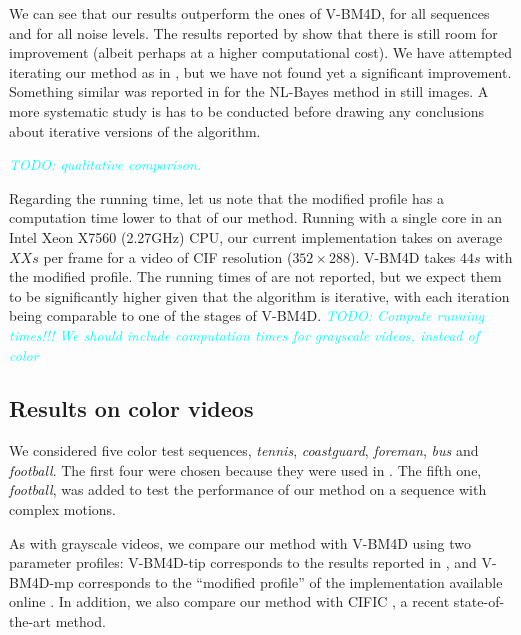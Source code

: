 \documentclass[10pt, journal, twocolumn, final, a4paper]{IEEEtran}
\newcommand{\pa}[1]{\textcolor{cyan}{#1}}
\newcommand{\pcomment}[1]{\textit{\pa{#1}}}
\begin{document}
We can see that our results outperform the ones of V-BM4D, for all sequences and 
for all noise levels. The results reported by \cite{LiZhangDai2011} show that there
is still room for improvement (albeit perhaps at a higher computational cost).
%
We have attempted iterating our method as in \cite{LiZhangDai2011},
but we have not found yet a significant improvement. Something similar was
reported in \cite{Lebrun2013ipol,Lebrun2013a} for the NL-Bayes method in still
images. %
A more systematic study is has to be conducted before drawing any
conclusions about iterative versions of the algorithm.

\pcomment{TODO: qualitative comparison.}

Regarding the running time, let us note that the modified profile has a
computation time lower to that of our method. Running with a
single core in an Intel Xeon X7560 (2.27GHz) CPU, 
our current implementation takes on average $XXs$ per frame for a video of CIF
resolution ($352\times288$). V-BM4D takes $44s$ with the modified profile.
The running times of \cite{LiZhangDai2011} are not reported, but we expect them
to be significantly higher given that the algorithm is iterative, with each iteration 
being comparable to one of the stages of V-BM4D.
\pcomment{TODO: Compute running times!!!}
\pcomment{We should include computation times for grayscale videos, instead of color}


\subsection{Results on color videos}

We considered five color test sequences, \emph{tennis}, \emph{coastguard},
\emph{foreman}, \emph{bus} and \emph{football}. The first four were chosen
because they were used in \cite{Maggioni2012}. The fifth one, \emph{football},
was added to test the performance of our method on a sequence with complex motions.

As with grayscale videos, we compare our method with V-BM4D using two parameter profiles:
V-BM4D-tip corresponds to the results reported in \cite{Maggioni2012}, and
V-BM4D-mp corresponds to the ``modified profile''
of the implementation available online \cite{bm4dcode}.
In addition, we also compare our method with CIFIC \cite{Dai2013}, a recent
state-of-the-art method.
\end{document}
